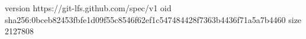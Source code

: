 version https://git-lfs.github.com/spec/v1
oid sha256:0bceb82453fbfe1d09f55c8546f62ef1c547484428f7363b4436f71a5a7b4460
size 2127808

